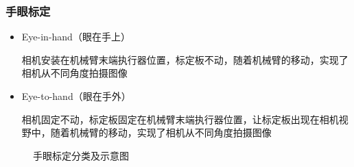 \documentclass[aspectratio=43]{beamer}
\begin{document}
	\begin{frame}
	\frametitle{手眼标定}
	
	\begin{itemize}
		\item Eye-in-hand（眼在手上）
		
		相机安装在机械臂末端执行器位置，标定板不动，随着机械臂的移动，实现了相机从不同角度拍摄图像
		\item Eye-to-hand（眼在手外）
		
		相机固定不动，标定板固定在机械臂末端执行器位置，让标定板出现在相机视野中，随着机械臂的移动，实现了相机从不同角度拍摄图像

	\end{itemize}


	\begin{figure}
	\setcounter{subfigure}{0}
	\caption{手眼标定分类及示意图}    %
	\label{手眼标定分类}
	\end{figure}
	\end{frame}
\end{document}
